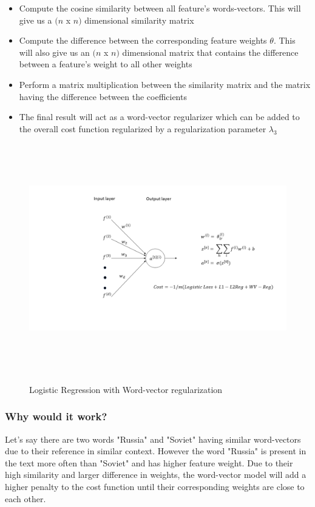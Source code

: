 \begin{itemize}
\item Compute the cosine similarity between all feature's words-vectors. This will give us a $(n$ x $n)$ dimensional similarity matrix
\item Compute the difference between the corresponding feature weights $\theta$. This will also give us an $(n$ x $n)$ dimensional matrix that contains the difference between a feature's weight to all other weights
\item Perform a matrix multiplication between the similarity matrix and the matrix having the difference between the coefficients
\item The final result will act as a word-vector regularizer which can be added to the overall cost function regularized by a regularization parameter $\lambda_{3}$

\end{itemize}

\newpage

\begin{figure}[htbp]
\centering
\includegraphics[width=16cm, height=10cm]{images/model3.png}\\
\centering
\caption{Logistic Regression with Word-vector regularization}
\label{fig:foo}
\end{figure}

\subsubsection{Why would it work?}

Let's say there are two words "Russia" and "Soviet" having similar word-vectors due to their reference in similar context. However the word "Russia" is present in the text more often than "Soviet" and has higher feature weight. Due to their high similarity and larger difference in weights, the word-vector model will add a higher penalty to the cost function until their corresponding weights are close to each other.

